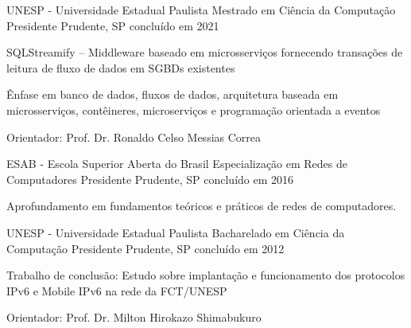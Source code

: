 

\begin{cventries}

  \cventry
    {UNESP - Universidade Estadual Paulista} %
    {Mestrado em Ciência da Computação} %
    {Presidente Prudente, SP} %
    {concluído em 2021} %
    {
      \begin{cvitems} %
        \item {SQLStreamify – Middleware baseado em microsserviços fornecendo transações de leitura de fluxo de dados em SGBDs existentes}
        \item {Ênfase em banco de dados, fluxos de dados, arquitetura baseada em microsserviços, contêineres, microserviços e programação orientada a eventos}
        \item {Orientador: Prof. Dr. Ronaldo Celso Messias Correa}
      \end{cvitems}
    }

  \cventry
    {ESAB - Escola Superior Aberta do Brasil} %
    {Especialização em Redes de Computadores} %
    {Presidente Prudente, SP} %
    {concluído em 2016} %
    {
      \begin{cvitems} %
        \item {Aprofundamento em fundamentos teóricos e práticos de redes de computadores.}
      \end{cvitems}
    }

  \cventry
    {UNESP - Universidade Estadual Paulista} %
    {Bacharelado em Ciência da Computação} %
    {Presidente Prudente, SP} %
    {concluído em 2012} %
    {
      \begin{cvitems} %
        \item {Trabalho de conclusão: Estudo sobre implantação e funcionamento dos protocolos IPv6 e Mobile IPv6 na rede da FCT/UNESP}
        \item {Orientador: Prof. Dr. Milton Hirokazo Shimabukuro}
      \end{cvitems}
    }


\end{cventries}
